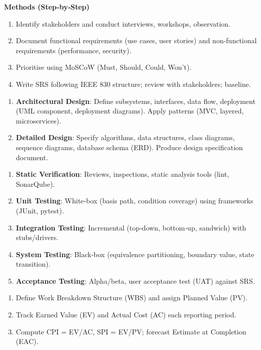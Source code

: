\documentclass[11pt]{article}
\begin{document}
\begin{bilan}
\textbf{Methods (Step‑by‑Step)}
\begin{methode}
\begin{enumerate}
\item Identify stakeholders and conduct interviews, workshops, observation.
\item Document functional requirements (use cases, user stories) and non‑functional requirements (performance, security).
\item Prioritise using MoSCoW (Must, Should, Could, Won’t).
\item Write SRS following IEEE 830 structure; review with stakeholders; baseline.
\end{enumerate}
\end{methode}

\begin{methode}
\begin{enumerate}
\item \textbf{Architectural Design}: Define subsystems, interfaces, data flow, deployment (UML component, deployment diagrams). Apply patterns (MVC, layered, microservices).
\item \textbf{Detailed Design}: Specify algorithms, data structures, class diagrams, sequence diagrams, database schema (ERD). Produce design specification document.
\end{enumerate}
\end{methode}

\begin{methode}
\begin{enumerate}
\item \textbf{Static Verification}: Reviews, inspections, static analysis tools (lint, SonarQube).
\item \textbf{Unit Testing}: White‑box (basis path, condition coverage) using frameworks (JUnit, pytest).
\item \textbf{Integration Testing}: Incremental (top‑down, bottom‑up, sandwich) with stubs/drivers.
\item \textbf{System Testing}: Black‑box (equivalence partitioning, boundary value, state transition).
\item \textbf{Acceptance Testing}: Alpha/beta, user acceptance test (UAT) against SRS.
\end{enumerate}
\end{methode}

\begin{methode}
\begin{enumerate}
\item Define Work Breakdown Structure (WBS) and assign Planned Value (PV).
\item Track Earned Value (EV) and Actual Cost (AC) each reporting period.
\item Compute CPI = EV/AC, SPI = EV/PV; forecast Estimate at Completion (EAC).
\end{enumerate}
\end{methode}


\end{bilan}
\end{document}
